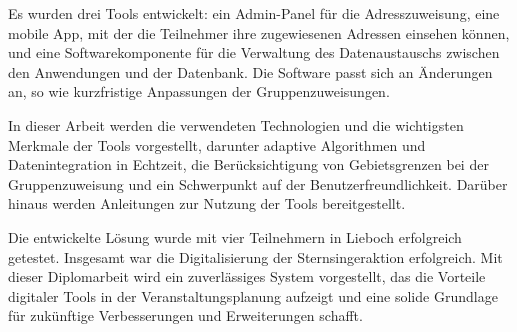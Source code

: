 \begin{spacing}{1.5}
Es wurden drei Tools entwickelt: ein Admin-Panel für die Adresszuweisung, eine mobile App, mit der die Teilnehmer ihre zugewiesenen Adressen einsehen können, und eine Softwarekomponente für die Verwaltung des Datenaustauschs zwischen den Anwendungen und der Datenbank. Die Software passt sich an Änderungen an, so wie kurzfristige Anpassungen der Gruppenzuweisungen.\blankLine

In dieser Arbeit werden die verwendeten Technologien und die wichtigsten Merkmale der Tools vorgestellt, darunter adaptive Algorithmen und Datenintegration in Echtzeit, die Berücksichtigung von Gebietsgrenzen bei der Gruppenzuweisung und ein Schwerpunkt auf der Benutzerfreundlichkeit. Darüber hinaus werden Anleitungen zur Nutzung der Tools bereitgestellt.\blankLine

Die entwickelte Lösung wurde mit vier Teilnehmern in Lieboch erfolgreich getestet. Insgesamt war die Digitalisierung der Sternsingeraktion erfolgreich. Mit dieser Diplomarbeit wird ein zuverlässiges System vorgestellt, das die Vorteile digitaler Tools in der Veranstaltungsplanung aufzeigt und eine solide Grundlage für zukünftige Verbesserungen und Erweiterungen schafft.\blankLine


\end{spacing}
